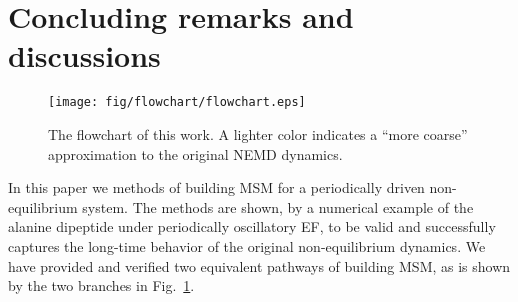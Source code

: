 \documentclass[aps, pre, preprint,unsortedaddress,a4paper,onecolumn]{revtex4}
\begin{document}
\section{Concluding remarks and discussions}

\begin{figure}
  \centering
  \texttt{[image: fig/flowchart/flowchart.eps]}
  \caption{The flowchart of this work. A lighter color indicates
  a ``more coarse'' approximation to the original NEMD dynamics.}
  \label{fig:flowchart}
\end{figure}

In this paper we methods of building MSM for a periodically driven
non-equilibrium system. The methods are shown, by a numerical example
of the alanine dipeptide under periodically oscillatory EF, to be
valid and successfully captures the long-time behavior of the original
non-equilibrium dynamics. We have provided and verified two equivalent
pathways of building MSM, as is shown by the two branches in
Fig.~\ref{fig:flowchart}.
\end{document}
